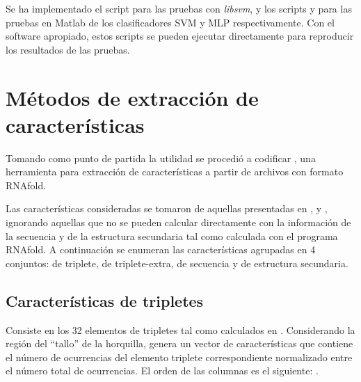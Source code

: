 \documentclass[12pt,bibliography=oldstyle,DIV=12,parskip=half-]{scrartcl}
\begin{document}
Se ha implementado el script  para las
pruebas con \emph{libsvm}, y los scripts  y
 para las pruebas en Matlab de los clasificadores
SVM y MLP respectivamente. Con el software apropiado, estos scripts
se pueden ejecutar directamente para reproducir los resultados de las
pruebas.
%
\section{Métodos de extracción de características}
%
Tomando como punto de partida la utilidad  se procedió
a codificar , una herramienta para extracción de
características a partir de archivos con formato RNAfold. 

Las características consideradas se tomaron de aquellas presentadas en
\cite{xue}, \cite{ng} y \cite{batuwita}, ignorando aquellas que
no se pueden calcular directamente con la información de la secuencia
y de la estructura secundaria tal como calculada con el programa
RNAfold. A continuación se enumeran las características agrupadas en 4
conjuntos: de triplete, de triplete-extra, de secuencia y de
estructura secundaria.
%
\subsection{Características de tripletes}
Consiste en los 32 elementos de tripletes tal como calculados en
\cite{xue}.  Considerando la región del ``tallo'' de la horquilla,
genera un vector de características que contiene el número de
ocurrencias del elemento triplete correspondiente normalizado entre el
número total de ocurrencias.  El orden de las columnas es el
siguiente: .
%
\end{document}
